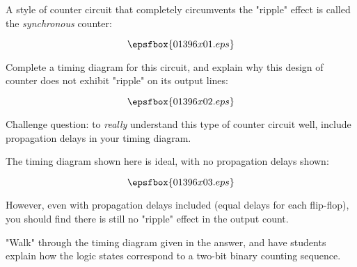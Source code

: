 

A style of counter circuit that completely circumvents the "ripple" effect is called the {\it synchronous} counter:

$$\epsfbox{01396x01.eps}$$

Complete a timing diagram for this circuit, and explain why this design of counter does not exhibit "ripple" on its output lines:

$$\epsfbox{01396x02.eps}$$

Challenge question: to {\it really} understand this type of counter circuit well, include propagation delays in your timing diagram.







The timing diagram shown here is ideal, with no propagation delays shown:

$$\epsfbox{01396x03.eps}$$

However, even with propagation delays included (equal delays for each flip-flop), you should find there is still no "ripple" effect in the output count.







"Walk" through the timing diagram given in the answer, and have students explain how the logic states correspond to a two-bit binary counting sequence.




